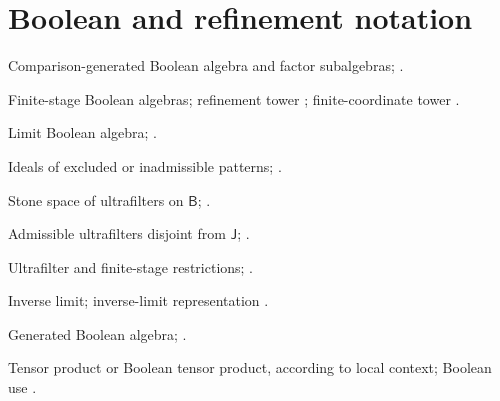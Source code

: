 \section*{Boolean and refinement notation}
\begin{description}[leftmargin=4.1cm,style=nextline,itemsep=0.2em,before=\raggedright]
\item[\(\mathsf B,\mathsf B_A,\mathsf B_B\)]
Comparison-generated Boolean algebra and factor subalgebras;
.
\item[\(\mathsf B_k,\mathsf B^{(n)}\)]
Finite-stage Boolean algebras; refinement tower
; finite-coordinate tower .
\item[\(\mathsf B_\infty\)]
Limit Boolean algebra; .
\item[\(\mathsf J,\mathsf J_k,\mathsf J_\infty\)]
Ideals of excluded or inadmissible patterns; .
\item[\(\UF(\mathsf B)\)]
Stone space of ultrafilters on \(\mathsf B\); .
\item[\(\UF(\mathsf B;\mathsf J)\)]
Admissible ultrafilters disjoint from \(\mathsf J\);
.
\item[\(\mathfrak u,\mathfrak u_k\)]
Ultrafilter and finite-stage restrictions; .
\item[\(\varprojlim\)]
Inverse limit; inverse-limit representation .
\item[\(\Bool(\cdot)\)]
Generated Boolean algebra; .
\item[\(\otimes\)]
Tensor product or Boolean tensor product, according to local context;
Boolean use .
\end{description}

